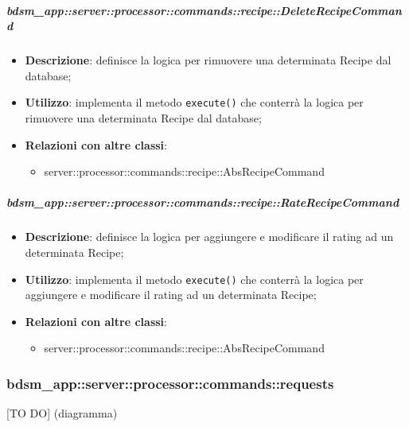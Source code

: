         \subparagraph{bdsm\_app::server::processor::commands::recipe::DeleteRecipeCommand} %
        \label{subp:bdsm_app_server_processor_commands_recipe_deleterecipecommand}
        \begin{itemize}
          \item \textbf{Descrizione}: definisce la logica per rimuovere una determinata Recipe dal database;
          \item \textbf{Utilizzo}: implementa il metodo \texttt{execute()} che conterrà la logica per rimuovere una determinata Recipe dal database;
          \item \textbf{Relazioni con altre classi}:
            \begin{itemize}
              \item server::processor::commands::recipe::AbsRecipeCommand
            \end{itemize}
        \end{itemize}

        \subparagraph{bdsm\_app::server::processor::commands::recipe::RateRecipeCommand} %
        \label{subp:bdsm_app_server_processor_commands_recipe_raterecipecommand}
        \begin{itemize}
          \item \textbf{Descrizione}: definisce la logica per aggiungere e modificare il rating ad un determinata Recipe;
          \item \textbf{Utilizzo}: implementa il metodo \texttt{execute()} che conterrà la logica per aggiungere e modificare il rating ad un determinata Recipe;
          \item \textbf{Relazioni con altre classi}:
            \begin{itemize}
              \item server::processor::commands::recipe::AbsRecipeCommand
            \end{itemize}
        \end{itemize}


      \subsubsection{bdsm\_app::server::processor::commands::requests} %
      \label{ssub:bdsm_app_server_processor_commands_requests}
      [TO DO] (diagramma) \newline \newline


